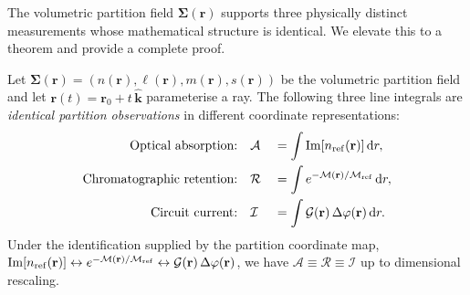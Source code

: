 The volumetric partition field $\boldsymbol{\Sigma}(\mathbf{r})$ supports three
physically distinct measurements whose mathematical structure is identical.  We
elevate this to a theorem and provide a complete proof.

\begin{theorem}
\label{thm:ch09-triple-observation}
Let $\boldsymbol{\Sigma}(\mathbf{r}) = (n(\mathbf{r}), \ell(\mathbf{r}),
m(\mathbf{r}), s(\mathbf{r}))$ be the volumetric partition field and let
$\mathbf{r}(t) = \mathbf{r}_0 + t\,\hat{\mathbf{k}}$ parameterise a ray.
The following three line integrals are \emph{identical partition observations}
in different coordinate representations:
\begin{alignat}{2}
  \text{Optical absorption:}\quad
    &\mathcal{A} &&= \int \operatorname{Im}[n_{\mathrm{ref}}(\mathbf{r})]\,\mathrm{d}r,
      \label{eq:ch09-optical-obs}\\
  \text{Chromatographic retention:}\quad
    &\mathcal{R} &&= \int e^{-\mathcal{M}(\mathbf{r})/\mathcal{M}_{\mathrm{ref}}}\,\mathrm{d}r,
      \label{eq:ch09-chrom-obs}\\
  \text{Circuit current:}\quad
    &\mathcal{I} &&= \int \mathcal{G}(\mathbf{r})\,\Delta\varphi(\mathbf{r})\,\mathrm{d}r.
      \label{eq:ch09-circuit-obs}
\end{alignat}
Under the identification supplied by the partition coordinate map,
$\operatorname{Im}[n_{\mathrm{ref}}(\mathbf{r})] \leftrightarrow
e^{-\mathcal{M}(\mathbf{r})/\mathcal{M}_{\mathrm{ref}}} \leftrightarrow
\mathcal{G}(\mathbf{r})\,\Delta\varphi(\mathbf{r})$,
we have $\mathcal{A} \equiv \mathcal{R} \equiv \mathcal{I}$ up to dimensional
rescaling.
\end{theorem}

